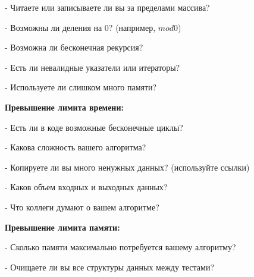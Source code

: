 - Читаете или записываете ли вы за пределами массива?  

- Возможны ли деления на 0? (например, $mod 0$)  

- Возможна ли бесконечная рекурсия?  

- Есть ли невалидные указатели или итераторы?  

- Используете ли слишком много памяти?  


\textbf{Превышение лимита времени:}  

- Есть ли в коде возможные бесконечные циклы?  

- Какова сложность вашего алгоритма?  

- Копируете ли вы много ненужных данных? (используйте ссылки)  

- Каков объем входных и выходных данных?

- Что коллеги думают о вашем алгоритме?  


\textbf{Превышение лимита памяти:}  

- Сколько памяти максимально потребуется вашему алгоритму?  

- Очищаете ли вы все структуры данных между тестами?  